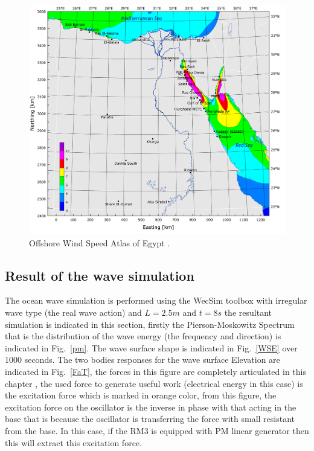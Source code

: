 \documentclass[conference]{IEEEtran}
\begin{document}
\begin{figure}[htbp]
	\centerline{\includegraphics[width=3.3 in]{fig/5.png}}
	\caption{Offshore Wind Speed Atlas of Egypt \cite{mortensen2006wind}.}
	\label{off}
\end{figure}

\subsection{Result of the wave simulation}
The ocean wave simulation is performed using the WecSim toolbox \cite{lucas2012development} with irregular wave type (the real wave action) and $L=2.5 m$ and $t=8 s$ the resultant simulation is indicated in this section, firstly the Pierson-Moskowitz Spectrum that is the distribution of the wave energy (the frequency and direction) is indicated in Fig.~\ref{pm}. The wave surface shape is indicated in Fig.~\ref{WSE} over 1000 seconds. The two bodies responses for the wave surface Elevation are indicated in Fig.~\ref{FaT}, the forces in this figure are completely articulated in this chapter \cite{pecher2017erratum}, the used force to generate useful work (electrical energy in this case) is the excitation force which is marked in orange color, from this figure, the excitation force on the oscillator is the inverse in phase with that acting in the base that is because the oscillator is transferring the force with small resistant from the base. In this case, if the RM3 is equipped with PM linear generator then this will extract this excitation force.
\end{document}

